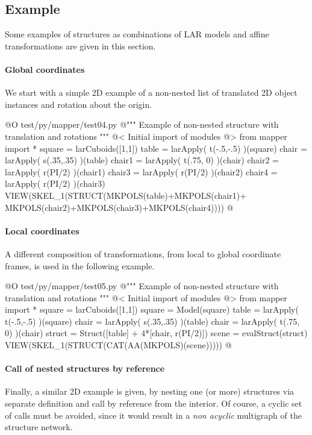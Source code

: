 \documentclass[11pt,oneside]{article}	%
\begin{document}
\subsection{Example}
Some examples of structures as combinations of LAR models and affine transformations are given in this section. 

\paragraph{Global coordinates}
We start with a simple 2D example of a non-nested list of translated 2D object instances and rotation about the origin.

@O test/py/mapper/test04.py
@{""" Example of non-nested structure with translation and rotations """
@< Initial import of modules @>
from mapper import *
square = larCuboids([1,1])
table = larApply( t(-.5,-.5) )(square)
chair = larApply( s(.35,.35) )(table)
chair1 = larApply( t(.75, 0) )(chair)
chair2 = larApply( r(PI/2) )(chair1)
chair3 = larApply( r(PI/2) )(chair2)
chair4 = larApply( r(PI/2) )(chair3)
VIEW(SKEL_1(STRUCT(MKPOLS(table)+MKPOLS(chair1)+
				   MKPOLS(chair2)+MKPOLS(chair3)+MKPOLS(chair4))))
@}

\paragraph{Local coordinates}
A different composition of transformations, from local to global coordinate frames, is used in the following example.

@O test/py/mapper/test05.py
@{""" Example of non-nested structure with translation and rotations """
@< Initial import of modules @>
from mapper import *
square = larCuboids([1,1])
square = Model(square)
table = larApply( t(-.5,-.5) )(square)
chair = larApply( s(.35,.35) )(table)
chair = larApply( t(.75, 0) )(chair)
struct = Struct([table] + 4*[chair, r(PI/2)])
scene = evalStruct(struct)
VIEW(SKEL_1(STRUCT(CAT(AA(MKPOLS)(scene)))))
@}

\paragraph{Call of nested structures by reference}
Finally, a similar 2D example is given, by nesting one (or more) structures via separate definition and call by reference from the interior. Of course, a cyclic set of calls must be avoided, since it would result in a \emph{non acyclic} multigraph of the structure network.
\end{document}
